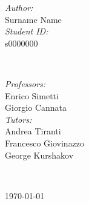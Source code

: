 \begin{titlepage}

\begin{minipage}{0.4\textwidth}
\begin{flushleft} \large
\emph{Author:}\\[0.2cm]
Surname Name %
\\[1.2em]
\emph{Student ID:}\\[0.2cm]
s0000000 \\[1.2em]
\end{flushleft}
\end{minipage}
~
\begin{minipage}{0.4\textwidth}
\begin{flushright} \large
\emph{Professors:} \\[0.2cm]
Enrico Simetti\\
Giorgio Cannata  \\[1.2em] %

\emph{Tutors:} \\[0.2cm]
Andrea Tiranti\\
Francesco Giovinazzo\\
George Kurshakov
\end{flushright}
\end{minipage}\\[2cm]
\makeatother



{\large \today}\\[2cm] %

\vfill %

\end{titlepage}